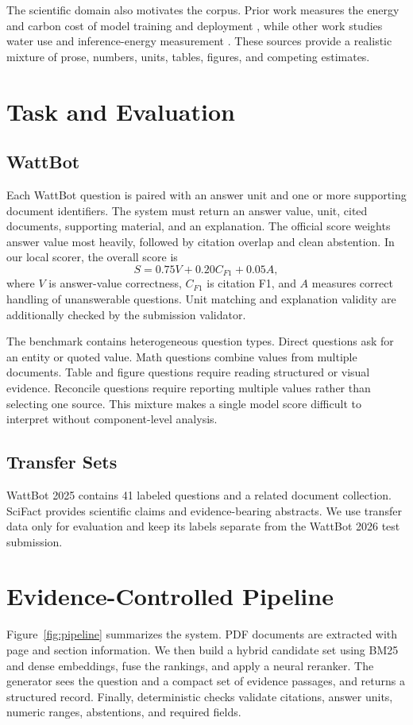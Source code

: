 \documentclass[11pt]{article}
\begin{document}
The scientific domain also motivates the corpus. Prior work measures the energy and carbon cost of model training and deployment \citep{patterson2021carbon,dodge2022carbon,luccioni2024power}, while other work studies water use and inference-energy measurement \citep{li2023thirsty,samsi2023watts,chung2025mlenergy}. These sources provide a realistic mixture of prose, numbers, units, tables, figures, and competing estimates.

\section{Task and Evaluation}
\label{sec:task}
\subsection{WattBot}
Each WattBot question is paired with an answer unit and one or more supporting document identifiers. The system must return an answer value, unit, cited documents, supporting material, and an explanation. The official score weights answer value most heavily, followed by citation overlap and clean abstention. In our local scorer, the overall score is
\begin{equation}
 S = 0.75 V + 0.20 C_{F1} + 0.05 A,
\end{equation}
where $V$ is answer-value correctness, $C_{F1}$ is citation F1, and $A$ measures correct handling of unanswerable questions. Unit matching and explanation validity are additionally checked by the submission validator.

The benchmark contains heterogeneous question types. Direct questions ask for an entity or quoted value. Math questions combine values from multiple documents. Table and figure questions require reading structured or visual evidence. Reconcile questions require reporting multiple values rather than selecting one source. This mixture makes a single model score difficult to interpret without component-level analysis.

\subsection{Transfer Sets}
WattBot 2025 contains 41 labeled questions and a related document collection. SciFact provides scientific claims and evidence-bearing abstracts. We use transfer data only for evaluation and keep its labels separate from the WattBot 2026 test submission.

\section{Evidence-Controlled Pipeline}
\label{sec:method}
Figure~\ref{fig:pipeline} summarizes the system. PDF documents are extracted with page and section information. We then build a hybrid candidate set using BM25 and dense embeddings, fuse the rankings, and apply a neural reranker. The generator sees the question and a compact set of evidence passages, and returns a structured record. Finally, deterministic checks validate citations, answer units, numeric ranges, abstentions, and required fields.
\end{document}
